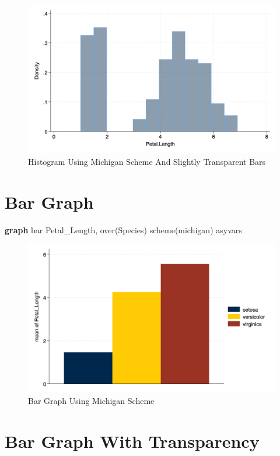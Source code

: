 \documentclass[
  letterpaper,
  DIV=11,
  numbers=noendperiod]{scrartcl}
\newenvironment{Shaded}{\begin{snugshade}}{\end{snugshade}}
\newcommand{\BaseNTok}[1]{\textcolor[rgb]{0.68,0.00,0.00}{#1}}
\newcommand{\DecValTok}[1]{\textcolor[rgb]{0.68,0.00,0.00}{#1}}
\newcommand{\KeywordTok}[1]{\textcolor[rgb]{0.00,0.23,0.31}{\textbf{#1}}}
\newcommand{\NormalTok}[1]{\textcolor[rgb]{0.00,0.23,0.31}{#1}}
\begin{document}
\begin{figure}[H]

{\centering \includegraphics[width=0.5\linewidth,height=\textheight,keepaspectratio]{myhistogram2.png}

}

\caption{Histogram Using Michigan Scheme And Slightly Transparent Bars}

\end{figure}%

\section{Bar Graph}\label{bar-graph}

\begin{Shaded}
\begin{Highlighting}[]
\KeywordTok{graph} \BaseNTok{bar}\NormalTok{ Petal\_Length, }\BaseNTok{over}\NormalTok{(Species) }\DecValTok{scheme}\NormalTok{(michigan) asyvars}
\end{Highlighting}
\end{Shaded}

\begin{figure}[H]

{\centering \includegraphics[width=0.5\linewidth,height=\textheight,keepaspectratio]{mybargraph.png}

}

\caption{Bar Graph Using Michigan Scheme}

\end{figure}%

\section{Bar Graph With Transparency}\label{bar-graph-with-transparency}
\end{document}
